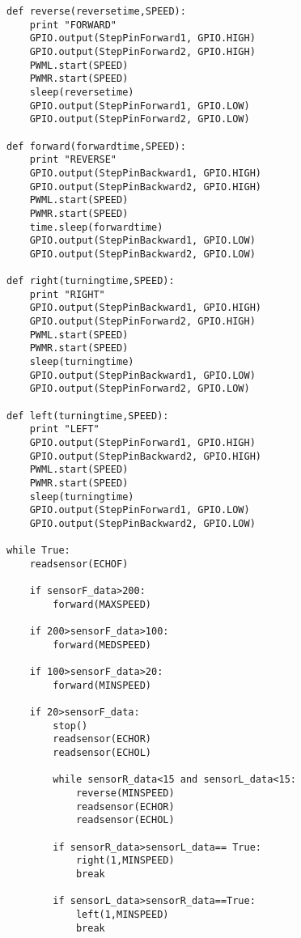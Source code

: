 \begin{lstlisting}
def reverse(reversetime,SPEED):
	print "FORWARD"
	GPIO.output(StepPinForward1, GPIO.HIGH)
	GPIO.output(StepPinForward2, GPIO.HIGH)
	PWML.start(SPEED)
	PWMR.start(SPEED)
	sleep(reversetime)
	GPIO.output(StepPinForward1, GPIO.LOW)
	GPIO.output(StepPinForward2, GPIO.LOW)

def forward(forwardtime,SPEED):
	print "REVERSE"
	GPIO.output(StepPinBackward1, GPIO.HIGH)
	GPIO.output(StepPinBackward2, GPIO.HIGH)
	PWML.start(SPEED)
	PWMR.start(SPEED)
	time.sleep(forwardtime)
	GPIO.output(StepPinBackward1, GPIO.LOW)
	GPIO.output(StepPinBackward2, GPIO.LOW)

def right(turningtime,SPEED):
	print "RIGHT"
	GPIO.output(StepPinBackward1, GPIO.HIGH)
	GPIO.output(StepPinForward2, GPIO.HIGH)
	PWML.start(SPEED)
	PWMR.start(SPEED)
	sleep(turningtime)
	GPIO.output(StepPinBackward1, GPIO.LOW)
	GPIO.output(StepPinForward2, GPIO.LOW)

def left(turningtime,SPEED):
	print "LEFT"
	GPIO.output(StepPinForward1, GPIO.HIGH)
	GPIO.output(StepPinBackward2, GPIO.HIGH)
	PWML.start(SPEED)
	PWMR.start(SPEED)
	sleep(turningtime)
	GPIO.output(StepPinForward1, GPIO.LOW)
	GPIO.output(StepPinBackward2, GPIO.LOW)

while True:
	readsensor(ECHOF)

	if sensorF_data>200:
		forward(MAXSPEED)
		
	if 200>sensorF_data>100:
		forward(MEDSPEED)

	if 100>sensorF_data>20:
		forward(MINSPEED)

	if 20>sensorF_data:
		stop()
		readsensor(ECHOR)
		readsensor(ECHOL)

		while sensorR_data<15 and sensorL_data<15:	
			reverse(MINSPEED)
			readsensor(ECHOR)
			readsensor(ECHOL)
			
		if sensorR_data>sensorL_data== True:
			right(1,MINSPEED)
			break
			
		if sensorL_data>sensorR_data==True:
			left(1,MINSPEED)
			break
			
\end{lstlisting}